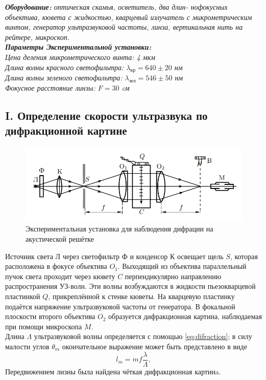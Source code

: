 \textit{\textbf{Оборудование:} оптическая скамья, осветитель, два длин-
нофокусных объектива, кювета с жидкостью, кварцевый излучатель
с микрометрическим винтом, генератор ультразвуковой частоты, линза, вертикальная нить на рейтере, микроскоп.}\\

\textit{\textbf{Параметры Экспериментальной установки:}}\\
\textit{Цена деления микрометрического винта: 4 мкм}\\
\textit{Длина волны красного светофильтра: $\lambda_{\text{кр}} = 640 \pm 20$ нм}\\
\textit{Длина волны зеленого светофильтра: $\lambda_{\text{зел}} = 546 \pm 50$ нм}\\
\textit{Фокусное расстояние линзы: $F = 30$ cм}\\


\subsection*{I. Определение скорости ультразвука по дифракционной картине}
\begin{figure}[h!]
    \centering
    \includegraphics[width=0.8\linewidth]{images/setup1.png}
    \caption{Экспериментальная установка для наблюдения дифрации на акустической решётке}
    \label{fig:setup1}
\end{figure}

\indent
Источник света Л через светофильтр Ф и конденсор К освещает щель $S$, которая расположена в фокусе объектива $O_1$. Выходящий из объектива параллельный пучок света проходит через кювету $C$ перпендикулярно направлению распространения УЗ-волн. Эти волны возбуждаются в жидкости пьезокварцевой пластинкой $Q$, прикреплённой к стенке кюветы. На кварцевую пластинку подаётся напряжение ультразвуковой частоты от генератора. В фокальной плоскости второго объектива $O_2$ образуется дифракционная картина, наблюдаемая при помощи микроскопа $M$. \\\indent
Длина $\Lambda$ ультразвуковой волны определяется с помощью \ref{eq:difraction}; в силу малости углов $\theta_m$ окончательное выражение может быть представлено в виде
$$
l_m = mf\frac{\lambda}{\Lambda},
$$
Передвижением лизны была найдена чёткая дифракционная картинa.


